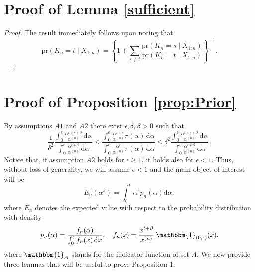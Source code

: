 \documentclass[12pt]{article}
\begin{document}
\section{Proof of Lemma \ref{sufficient}}
\begin{proof}
The result immediately follows upon noting that
\[
\text{pr}(K_n = t \mid X_{1:n})=  \left\{1+\sum_{s \neq t} \frac{\text{pr}(K_n = s \mid X_{1:n} )}{\text{pr}(K_n = t \mid X_{1:n})}\right\}^{-1}.
\]
\end{proof}



\section{Proof of Proposition \ref{prop:Prior}}
By assumptions $A1$ and $A2$ there exist $\epsilon, \delta, \beta > 0$ such that
\begin{equation}\label{motivation}
\frac{1}{\delta^2}\frac{\int_0^\epsilon \frac{\alpha^{t+s+\beta}}{\alpha^{(n)}}\, \mathrm{d}\alpha}{\int_0^\epsilon \frac{\alpha^{t+\beta}}{\alpha^{(n)}} \, \mathrm{d}\alpha}  \leq
\frac{\int_0^\epsilon \frac{\alpha^{t+s}}{\alpha^{(n)}}\pi(\alpha)\, \mathrm{d}\alpha}{\int_0^\epsilon \frac{\alpha^t}{\alpha^{(n)}}\pi(\alpha) \, \mathrm{d}\alpha}  \leq \delta^2\frac{\int_0^\epsilon \frac{\alpha^{t+s+\beta}}{\alpha^{(n)}}\, \mathrm{d}\alpha}{\int_0^\epsilon \frac{\alpha^{t+\beta}}{\alpha^{(n)}} \, \mathrm{d}\alpha}\,.
\end{equation}
Notice that, if assumption $A2$ holds for $\epsilon \geq 1$, it holds also for $\epsilon < 1$. Thus, without loss of generality, we will assume $\epsilon < 1$ and the main object of interest will be
\[
E_{n}(\alpha^{s})= \int_0^\epsilon \alpha^{s} p_{n}(\alpha) \mathrm{d}\alpha,
\]
where $E_n$ denotes the expected value with respect to the probability distribution with density
\begin{equation}\label{n_density}
p_n(\alpha) = \frac{f_n(\alpha)}{\int_0^\epsilon f_n(x)\, \mathrm{d}x}, \quad 
f_n(x) = \frac{x^{t+\beta}}{x^{(n)}}\:\mathbbm{1}_{(0,\epsilon)}(x),
\end{equation}
where $\mathbbm{1}_A$ stands for the indicator function of set $A$. We now provide three lemmas that will be useful to prove Proposition 1.
\end{document}
